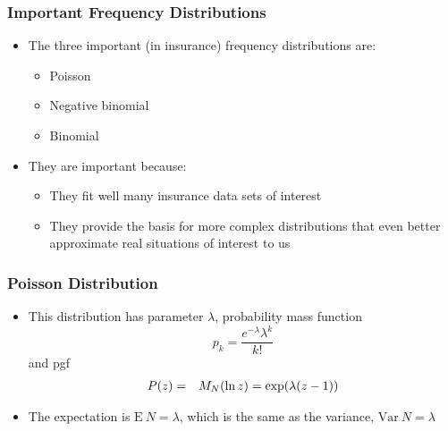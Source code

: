 \documentclass{beamer}
\begin{document}
\begin{frame}%
 \frametitle{Important Frequency Distributions}
\begin{itemize}
   \item The three important (in insurance) frequency distributions
   are: \vspace{2mm}
\begin{itemize}
\item Poisson \vspace{2mm}
\item Negative binomial \vspace{2mm}
\item Binomial \vspace{4mm}
 \end{itemize}
 \item They are important because: \vspace{2mm}
 \begin{itemize}
\item They fit well many insurance data sets of interest \vspace{2mm}
\item They provide the basis for more complex distributions that even better approximate real situations of interest to us
 \end{itemize}
 \end{itemize}
\end{frame}

\begin{frame}%
 \frametitle{Poisson Distribution}
\begin{itemize}
   \item This distribution has parameter $\lambda$, probability mass function
\begin{equation*}
p_k = \frac{e^{-\lambda}\lambda^k}{k!}
\end{equation*}
and pgf
\begin{eqnarray*}
P(z) &=& M_N (\ln z) = \exp(\lambda(z-1)) \vspace{2mm}
\end{eqnarray*}
\item The expectation is $\mathrm{E~}N = \lambda $, which is the same as the variance, $\mathrm{Var~}N = \lambda$
 \end{itemize}
\end{frame}
\end{document}

